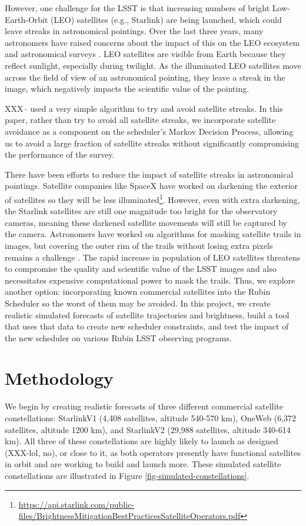 \documentclass[linenumbers]{aastex631}
\begin{document}
However, one challenge for the LSST is that increasing numbers of bright Low-Earth-Orbit (LEO) satellites (e.g., Starlink) are being launched, which could leave streaks in astronomical pointings. Over the last three years, many astronomers have raised concerns
about the impact of this on the LEO ecosystem and astronomical surveys \citep{lawrence22,tyson20}. LEO satellites are visible from Earth because they reflect sunlight, especially during twilight. As the illuminated LEO satellites move across the field of view of an astronomical pointing, they leave a streak in the image, which negatively impacts the scientific value of the pointing.

XXX--\citet{tyson20} used a very simple algorithm to try and avoid satellite streaks.  In this paper, rather than try to avoid all satellite streaks, we incorporate satellite avoidance as a component on the scheduler's Markov Decision Process, allowing us to avoid a large fraction of satellite streaks without significantly compromising the performance of the survey. 

There have been efforts to reduce the impact of satellite streaks in astronomical pointings. Satellite companies like SpaceX have worked on darkening the exterior of satellites so they will be less illuminated\footnote{\url{https://api.starlink.com/public-files/BrightnessMitigationBestPracticesSatelliteOperators.pdf}}. However, even with extra darkening, the Starlink satellites are still one magnitude too bright for the observatory cameras, meaning these darkened satellite movements will still be captured by the camera. Astronomers have worked on algorithms for masking satellite trails in images, but covering the outer rim of the trails without losing extra pixels remains a challenge \citep{tyson20}. The rapid increase in population of LEO satellites threatens to compromise the quality and scientific value of the LSST images and also necessitates expensive computational power to mask the trails. Thus, we explore another option: incorporating known commercial satellites into the Rubin Scheduler so the worst of them may be avoided. In this project, we create realistic simulated forecasts of satellite trajectories and brightness, build a tool that uses that data to create new scheduler constraints, and test the impact of the new scheduler on various Rubin LSST observing programs.

\section{Methodology}
We begin by creating realistic forecasts of three different commercial satellite constellations: StarlinkV1 (4,408 satellites, altitude 540-570 km), OneWeb (6,372 satellites, altitude 1200 km), and StarlinkV2 (29,988 satellites, altitude 340-614 km). All three of these constellations are highly likely to launch as designed (XXX-lol, no), or close to it, as both operators presently have functional satellites in orbit and are working to build and launch more. These simulated satellite constellations are illustrated in Figure \ref{fig-simulated-constellations}.
\end{document}
